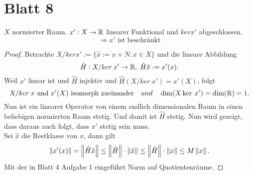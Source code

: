 	\setcounter{section}{7}
\section{Blatt 8}				

	\begin{beh}
		$X$ normierter Raum. $x' : X\to \mathbb{R}$ linearer Funktional und $ker x'$ abgeschlossen. 
		$$\Rightarrow x' \text{ ist beschränkt}$$
	\end{beh}
	\begin{proof}
		Betrachte $ X/ker x':= \{ \hat{x} := x + N: x\in X\} $ und die lineare Abbildung
			$$ \hat{H} : X/ker \:x' \to \mathbb{R}, \; \hat{H}\hat{x} := x'(x).$$
		Weil $x'$ linear ist und $\hat{H}$ injektiv und $\hat{H}(X/ker\: x') = x'(X)$, folgt
			$$X/ker\:x \text{ und } x'(X) \text{ isomorph zueinander} \quad und \quad \dim(X\ker \:x') = \dim(\mathbb{R}) = 1.$$ 
	Nun ist ein linearer Operator von einem endlich dimensionalen Raum in einen beliebigen normierten Raum stetig. Und damit ist $\hat{H}$ stetig. Nun wird gezeigt, dass daraus auch folgt, dass $x'$ stetig sein muss.\\
	Sei $\hat{x}$ die Restklasse von $x$, dann gilt 
		$$\left \|x'(x)\right\| = \left \|\hat{H}\hat{x}\right\| \leq \left \|\hat{H}\right\| \cdot \left \|\hat{x}\right\| \leq \left \|\hat{H}\right\| \cdot \left \|{x}\right\| \leq M \left \|x\right\|. $$ 
	Mit der in Blatt 4 Aufgabe 1 eingeführt Norm auf Quotientenräume.	
	\end{proof}
